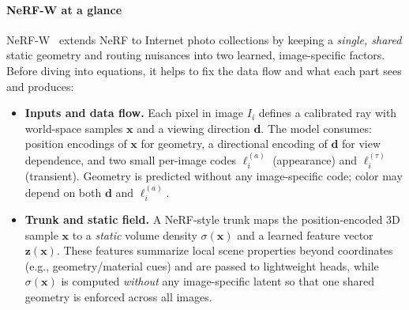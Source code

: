 \begin{enrichment}
\begin{enrichment}
        \paragraph{NeRF-W at a glance}
        NeRF-W~\cite{martinbrualla2021_nerfw} extends NeRF to Internet photo collections by keeping a \emph{single, shared} static geometry and routing nuisances into two learned, image-specific factors. Before diving into equations, it helps to fix the data flow and what each part sees and produces:
        \begin{itemize}[leftmargin=*,itemsep=0.3em]
            \item \textbf{Inputs and data flow.} Each pixel in image \(I_i\) defines a calibrated ray with world-space samples \(\mathbf{x}\) and a viewing direction \(\mathbf{d}\). The model consumes: position encodings of \(\mathbf{x}\) for geometry, a directional encoding of \(\mathbf{d}\) for view dependence, and two small per-image codes \(\ell^{(a)}_i\) (appearance) and \(\ell^{(\tau)}_i\) (transient). Geometry is predicted without any image-specific code; color may depend on both \(\mathbf{d}\) and \(\ell^{(a)}_i\).
            \item \textbf{Trunk and static field.} A NeRF-style trunk maps the position-encoded 3D sample \(\mathbf{x}\) to a \emph{static} volume density \(\sigma(\mathbf{x})\) and a learned feature vector \(\mathbf{z}(\mathbf{x})\). These features summarize local scene properties beyond coordinates (e.g., geometry/material cues) and are passed to lightweight heads, while \(\sigma(\mathbf{x})\) is computed \emph{without} any image-specific latent so that one shared geometry is enforced across all images.
            
            \newpage
            

\end{itemize}
\end{enrichment}
\end{enrichment}

